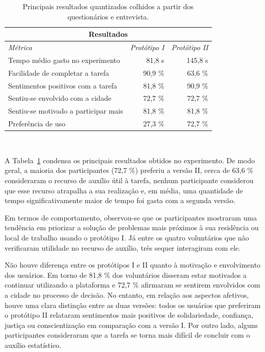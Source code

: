 \documentclass{sigchi}
\begin{document}
\begin{table}
	\centering
	\begin{tabular}{l r r}
		\multicolumn{3}{c}{\small{\textbf{Resultados}}} \\
		\midrule
		{\small\textit{Métrica}}
		& {\small \textit{Protótipo I}}
		& {\small \textit{Protótipo II}} \\
		\midrule
		Tempo médio gasto no experimento & 81,8 s & 145,8 s\\
		Facilidade de completar a tarefa & 90,9 \% & 63,6 \%\\
		Sentimentos positivos com a tarefa & 81,8 \% & 90,9 \% \\
		Sentiu-se envolvido com a cidade & 72,7 \% & 72,7 \%\\
		Sentiu-se motivado a participar mais & 81,8 \% & 81,8 \%\\
		Preferência de uso & 27,3 \% & 72,7 \%\\
	\end{tabular}
	\caption{Principais resultados quantizados colhidos a partir dos questionários e entrevista.}~\label{tab:table1}
\end{table}

A Tabela~\ref{tab:table1} condensa os principais resultados obtidos no experimento. De modo geral, a maioria dos participantes (72,7 \%) preferiu a versão II, cerca de 63,6 \% consideraram o recurso de auxílio útil à tarefa, nenhum participante considerou que esse recurso atrapalha a sua realização e, em média, uma quantidade de tempo significativamente maior de tempo foi gasta com a segunda versão.

Em termos de comportamento, observou-se que os participantes mostraram uma tendência em priorizar a solução de problemas mais próximos à sua residência ou local de trabalho usando o protótipo I. Já entre os quatro voluntários que não verificaram utilidade no recurso de auxílio, três sequer interagiram com ele.

Não houve diferença entre os protótipos I e II quanto à motivação e envolvimento dos usuários. Em torno de 81,8 \% dos voluntários disseram estar motivados a continuar utilizando a plataforma e 72,7 \% afirmaram se sentirem envolvidos com a cidade no processo de decisão. No entanto, em relação aos aspectos afetivos, houve uma clara distinção entre as duas versões: todos os usuários que preferiram o protótipo II relataram sentimentos mais positivos de solidariedade, confiança, justiça ou conscientização em comparação com a versão I. Por outro lado, alguns participantes consideraram que a tarefa se torna mais difícil de concluir com o auxílio estatístico.
\end{document}
